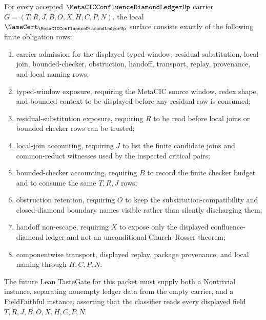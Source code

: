 \begin{theorem}
\label{thm:metacic-confluence-diamond-ledger-namecert-obligations}
For every accepted $\MetaCICConfluenceDiamondLedgerUp$ carrier $G=(T,R,J,B,O,X,H,C,P,N)$, the local $\NameCert_{\MetaCICConfluenceDiamondLedgerUp}$ surface consists exactly of the following finite obligation rows:
\begin{enumerate}
\item carrier admission for the displayed typed-window, residual-substitution, local-join, bounded-checker, obstruction, handoff, transport, replay, provenance, and local naming rows;
\item typed-window exposure, requiring the MetaCIC source window, redex shape, and bounded context to be displayed before any residual row is consumed;
\item residual-substitution exposure, requiring $R$ to be read before local joins or bounded checker rows can be trusted;
\item local-join accounting, requiring $J$ to list the finite candidate joins and common-reduct witnesses used by the inspected critical pairs;
\item bounded-checker accounting, requiring $B$ to record the finite checker budget and to consume the same $T,R,J$ rows;
\item obstruction retention, requiring $O$ to keep the substitution-compatibility and closed-diamond boundary names visible rather than silently discharging them;
\item handoff non-escape, requiring $X$ to expose only the displayed confluence-diamond ledger and not an unconditional Church--Rosser theorem;
\item componentwise transport, displayed replay, package provenance, and local naming through $H,C,P,N$.
\end{enumerate}
The future Lean TasteGate for this packet must supply both a Nontrivial instance, separating nonempty ledger data from the empty carrier, and a FieldFaithful instance, asserting that the classifier reads every displayed field $T,R,J,B,O,X,H,C,P,N$.
\end{theorem}
